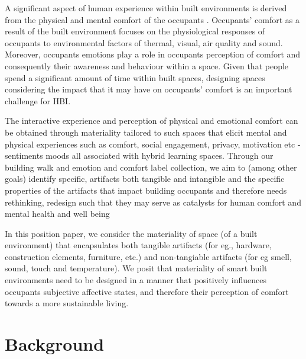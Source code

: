 \documentclass[acmconf, anonymous, review]{acmart}
\begin{document}
A significant aspect of human experience within built environments is derived from the physical and mental comfort of the occupants \cite{alavi2017comfort}. Occupants' comfort as a result of the built environment focuses on the physiological responses of occupants to environmental factors of thermal, visual, air quality and sound. Moreover, occupants emotions play a role in occupants perception of comfort and consequently their awareness and behaviour within a space. Given that people spend a significant amount of time within built spaces, designing spaces considering the impact that it may have on occupants’ comfort is an important challenge for HBI. 

The interactive experience and perception of physical and emotional comfort can be obtained through materiality
tailored to such spaces that elicit mental and physical experiences such as comfort, social engagement, privacy,
motivation etc - sentiments moods all associated with hybrid learning spaces. Through our building walk and emotion
and comfort label collection, we aim to (among other goals) identify specific, artifacts both tangible and intangible and
the specific properties of the artifacts that impact building occupants and therefore needs rethinking, redesign such
that they may serve as catalysts for human comfort and mental health and well being


In this position paper, we consider the materiality of space (of a built environment) that encapsulates both tangible artifacts (for eg., hardware, construction elements, furniture, etc.) and non-tangiable artifacts (for eg smell, sound, touch and temperature). We posit that materiality of smart built environments need to be designed in a manner that positively influences occupants subjective affective states, and therefore their perception of comfort towards a more sustainable living. 






\section{Background}
\end{document}
